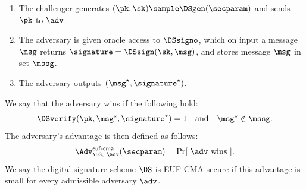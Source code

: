\begin{enumerate}

  \item The challenger generates $(\pk,\sk)\sample\DSgen(\secparam)$ and sends
    $\pk$ to $\adv$.

  \item The adversary is given oracle access to $\DSsigno$, which on input a
    message $\msg$ returns $\signature = \DSsign(\sk, \msg)$, and stores
    message $\msg$ in set $\mssg$.

  \item The adversary outputs $(\msg^\star, \signature^\star)$.

\end{enumerate}
%
We say that the adversary wins if the following hold:
%
\begin{equation*}
%
  \DSverify(\pk,\msg^\star,\signature^\star)=1  \quad\text{and}\quad \msg^\star
  \notin \mssg.
\end{equation*}
%
The adversary's advantage is then defined as follows:
%
\begin{equation*}
%
  \Adv^{\mathsf{euf\text{-}cma}}_{\DS, \ \adv}(\secparam) = \Pr[ \ \adv\text{
  wins} \ ].
%
\end{equation*}
%
We say the digital signature scheme $\DS$ is EUF-CMA secure if this advantage
is small for every admissible adversary $\adv$.
